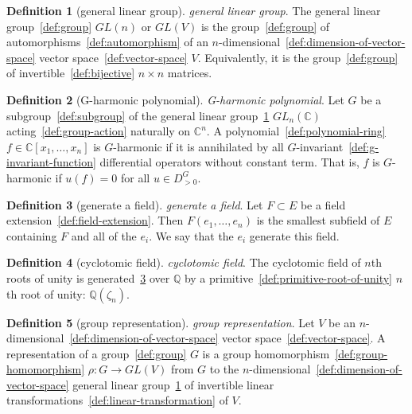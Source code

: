 \documentclass[12pt,a4paper]{article}
\theoremstyle{definition}
\newtheorem{definition}{Definition}
\begin{document}
\begin{definition}[general linear group]\label{def:general-linear-group}
\emph{general linear group}. The general linear group~\ref{def:group} $GL(n)$ or $GL(V)$ is the group~\ref{def:group} of automorphisms~\ref{def:automorphism} of an $n$-dimensional~\ref{def:dimension-of-vector-space} vector space~\ref{def:vector-space} $V$. Equivalently, it is the group~\ref{def:group} of invertible~\ref{def:bijective} $n\times n$ matrices.
\end{definition}

\begin{definition}[G-harmonic polynomial]\label{def:g-harmonic-polynomial}
\emph{G-harmonic polynomial}. Let $G$ be a subgroup~\ref{def:subgroup} of the general linear group~\ref{def:general-linear-group} $GL_n(\mathbb C)$ acting~\ref{def:group-action} naturally on $\mathbb C^n$. A polynomial~\ref{def:polynomial-ring} $f\in \mathbb C[x_1,\dots,x_n]$ is $G$-harmonic if it is annihilated by all $G$-invariant~\ref{def:g-invariant-function} differential operators without constant term. That is, $f$ is $G$-harmonic if $u(f) = 0$ for all $u \in D^G_{>0}$.
\end{definition}

\begin{definition}[generate a field]\label{def:generate-a-field}
\emph{generate a field}. Let $F\subset E$ be a field extension~\ref{def:field-extension}. Then $F(e_1,\dots, e_n)$ is the smallest subfield of $E$ containing $F$ and all of the $e_i$. We say that the $e_i$ generate this field.
\end{definition}

\begin{definition}[cyclotomic field]\label{def:cyclotomic-field}
\emph{cyclotomic field}. The cyclotomic field of $n$th roots of unity is generated~\ref{def:generate-a-field} over $\mathbb Q$ by a primitive~\ref{def:primitive-root-of-unity} $n$th root of unity: $\mathbb Q(\zeta_n)$.
\end{definition}

\begin{definition}[group representation]\label{def:group-representation}
\emph{group representation}. Let $V$ be an $n$-dimensional~\ref{def:dimension-of-vector-space} vector space~\ref{def:vector-space}. A representation of a group~\ref{def:group} $G$ is a group homomorphism~\ref{def:group-homomorphism} $\rho: G \to GL(V)$ from $G$ to the $n$-dimensional~\ref{def:dimension-of-vector-space} general linear group~\ref{def:general-linear-group} of invertible linear transformations~\ref{def:linear-transformation} of $V$.
\end{definition}
\end{document}
